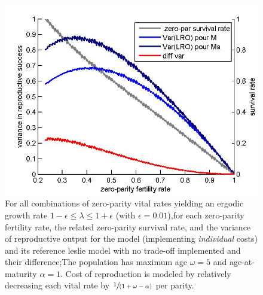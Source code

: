 \documentclass[10pt,a4paper]{article}
\newcommand{\PCoR}{\emph{individual} costs}
\begin{document}
  




\begin{figure}[hbtp]%
\centering
\includegraphics[scale=.22]{diffvarlam1.jpg}

\caption{ For all combinations of zero-parity vital rates yielding an ergodic growth rate $1-\epsilon \leq \lambda \leq 1+\epsilon$ (with $\epsilon=0.01$),for each zero-parity fertility rate, the related zero-parity survival rate, and the variance of reproductive output for the model (implementing \PCoR) and its reference leslie model with no trade-off implemented and their difference;The population has maximum age $\omega=5$ and age-at-maturity $\alpha=1$. Cost of reproduction is modeled by relatively decreasing each vital rate by $\sfrac{1}{(1+\omega -\alpha)}$ per parity.}
\label{fig:diffvarlam1}
\end{figure}
\end{document}
